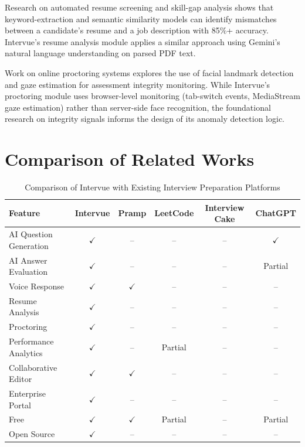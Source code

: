 \documentclass{fisatprojectfinal}
\begin{document}
Research on automated resume screening and skill-gap analysis shows that keyword-extraction
and semantic similarity models can identify mismatches between a candidate's resume and a
job description with 85\%+ accuracy. Intervue's resume analysis module applies a similar
approach using Gemini's natural language understanding on parsed PDF text.

Work on online proctoring systems explores the use of facial landmark detection and gaze
estimation for assessment integrity monitoring. While Intervue's proctoring module uses
browser-level monitoring (tab-switch events, MediaStream gaze estimation) rather than
server-side face recognition, the foundational research on integrity signals informs the
design of its anomaly detection logic.

\section{Comparison of Related Works}

\begin{table}[h!]
\centering
\caption{Comparison of Intervue with Existing Interview Preparation Platforms}
\begin{tabular}{|p{3cm}|c|c|c|c|c|}
\hline
\textbf{Feature} & \textbf{Intervue} & \textbf{Pramp} & \textbf{LeetCode}
  & \textbf{Interview Cake} & \textbf{ChatGPT} \\
\hline
AI Question Generation  & $\checkmark$ & --           & --      & --  & $\checkmark$ \\
\hline
AI Answer Evaluation    & $\checkmark$ & --           & --      & --  & Partial \\
\hline
Voice Response          & $\checkmark$ & $\checkmark$ & --      & --  & -- \\
\hline
Resume Analysis         & $\checkmark$ & --           & --      & --  & -- \\
\hline
Proctoring              & $\checkmark$ & --           & --      & --  & -- \\
\hline
Performance Analytics   & $\checkmark$ & --           & Partial & --  & -- \\
\hline
Collaborative Editor    & $\checkmark$ & $\checkmark$ & --      & --  & -- \\
\hline
Enterprise Portal       & $\checkmark$ & --           & --      & --  & -- \\
\hline
Free                    & $\checkmark$ & $\checkmark$ & Partial & --  & Partial \\
\hline
Open Source             & $\checkmark$ & --           & --      & --  & -- \\
\hline
\end{tabular}
\end{table}
\end{document}
